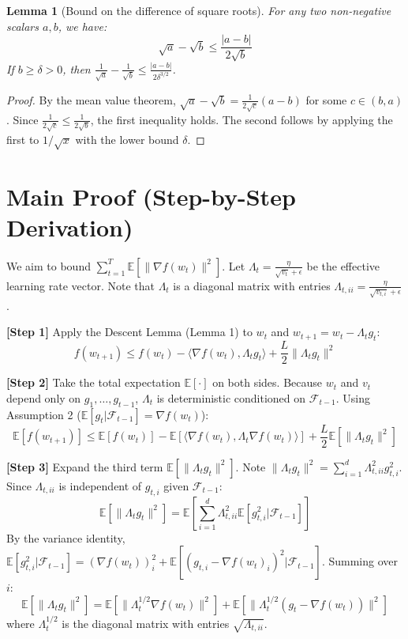 \documentclass{article}
\newtheorem{lemma}[theorem]{Lemma}
\begin{document}
\begin{lemma}[Bound on the difference of square roots]
For any two non-negative scalars $a, b$, we have:
$$ \sqrt{a} - \sqrt{b} \leq \frac{|a - b|}{2\sqrt{b}} $$
If $b \geq \delta > 0$, then $\frac{1}{\sqrt{a}} - \frac{1}{\sqrt{b}} \leq \frac{|a - b|}{2\delta^{3/2}}$.
\end{lemma}
\begin{proof}
By the mean value theorem, $\sqrt{a} - \sqrt{b} = \frac{1}{2\sqrt{c}}(a - b)$ for some $c \in (b, a)$. Since $\frac{1}{2\sqrt{c}} \leq \frac{1}{2\sqrt{b}}$, the first inequality holds. The second follows by applying the first to $1/\sqrt{x}$ with the lower bound $\delta$.
\end{proof}

\section*{Main Proof (Step-by-Step Derivation)}
We aim to bound $\sum_{t=1}^T \mathbb{E}[\|\nabla f(w_t)\|^2]$. Let $\Lambda_t = \frac{\eta}{\sqrt{v_t} + \epsilon}$ be the effective learning rate vector. Note that $\Lambda_t$ is a diagonal matrix with entries $\Lambda_{t,ii} = \frac{\eta}{\sqrt{v_{t,i}} + \epsilon}$.

\textbf{[Step 1]} Apply the Descent Lemma (Lemma 1) to $w_t$ and $w_{t+1} = w_t - \Lambda_t g_t$:
$$ f(w_{t+1}) \leq f(w_t) - \langle \nabla f(w_t), \Lambda_t g_t \rangle + \frac{L}{2} \|\Lambda_t g_t\|^2 $$

\textbf{[Step 2]} Take the total expectation $\mathbb{E}[\cdot]$ on both sides. Because $w_t$ and $v_t$ depend only on $g_1, \dots, g_{t-1}$, $\Lambda_t$ is deterministic conditioned on $\mathcal{F}_{t-1}$. Using Assumption 2 ($\mathbb{E}[g_t | \mathcal{F}_{t-1}] = \nabla f(w_t)$):
$$ \mathbb{E}[f(w_{t+1})] \leq \mathbb{E}[f(w_t)] - \mathbb{E}[\langle \nabla f(w_t), \Lambda_t \nabla f(w_t) \rangle] + \frac{L}{2} \mathbb{E}[\|\Lambda_t g_t\|^2] $$

\textbf{[Step 3]} Expand the third term $\mathbb{E}[\|\Lambda_t g_t\|^2]$. Note $\|\Lambda_t g_t\|^2 = \sum_{i=1}^d \Lambda_{t,ii}^2 g_{t,i}^2$. Since $\Lambda_{t,ii}$ is independent of $g_{t,i}$ given $\mathcal{F}_{t-1}$:
$$ \mathbb{E}[\|\Lambda_t g_t\|^2] = \mathbb{E}\left[ \sum_{i=1}^d \Lambda_{t,ii}^2 \mathbb{E}[g_{t,i}^2 | \mathcal{F}_{t-1}] \right] $$
By the variance identity, $\mathbb{E}[g_{t,i}^2 | \mathcal{F}_{t-1}] = (\nabla f(w_t))_i^2 + \mathbb{E}[(g_{t,i} - \nabla f(w_t)_i)^2 | \mathcal{F}_{t-1}]$. Summing over $i$:
$$ \mathbb{E}[\|\Lambda_t g_t\|^2] = \mathbb{E}[\|\Lambda_t^{1/2} \nabla f(w_t)\|^2] + \mathbb{E}[\|\Lambda_t^{1/2} (g_t - \nabla f(w_t))\|^2] $$
where $\Lambda_t^{1/2}$ is the diagonal matrix with entries $\sqrt{\Lambda_{t,ii}}$.
\end{document}
